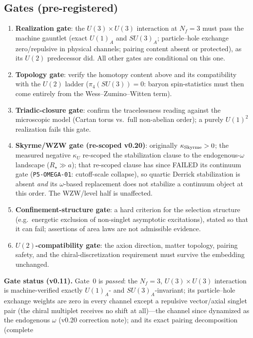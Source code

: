 \documentclass[11pt,a4paper]{article}
\begin{document}
\subsection*{Gates (pre-registered)}
\begin{enumerate}
\item[0.] \textbf{Realization gate}: the
$U(3)\times U(3)$ interaction at $N_f = 3$ must pass the machine
gauntlet (exact $U(1)_A$ and $SU(3)_A$; particle--hole exchange
zero/repulsive in physical channels; pairing content
absent or protected), as its $U(2)$ predecessor did.  All other
gates are conditional on this one.
\item[1.] \textbf{Topology gate}: verify the homotopy content
above and its compatibility with the $U(2)$ ladder
($\pi_4(SU(3)) = 0$: baryon spin-statistics must then come
entirely from the Wess--Zumino--Witten term).
\item[2.] \textbf{Triadic-closure gate}: confirm the
tracelessness reading against the microscopic model (Cartan
torus vs.\ full non-abelian order); a purely $U(1)^2$ realization
fails this gate.
\item[3.] \textbf{Skyrme/WZW gate (re-scoped v0.20)}: originally
$\kappa_{\rm Skyrme} > 0$; the measured negative $\kappa_U$
re-scoped the stabilization clause to the endogenous-$\omega$
landscape ($R_\star \gg a$); that re-scoped clause has since
FAILED its continuum gate (\texttt{P5-OMEGA-01}: cutoff-scale
collapse), so quartic Derrick stabilization is absent \emph{and}
its $\omega$-based replacement does not stabilize a continuum
object at this order.  The WZW/level half is unaffected.
\item[4.] \textbf{Confinement-structure gate}: a hard criterion
for the selection structure (e.g.\ energetic exclusion of
non-singlet asymptotic excitations), stated so that it can fail;
assertions of area laws are not admissible evidence.
\item[5.] \textbf{$U(2)$-compatibility gate}: the axion
direction, matter topology, pairing safety, and the
chiral-discretization requirement must survive the embedding
unchanged.
\end{enumerate}
\textbf{Gate status (v0.11).}  Gate~0 is \emph{passed}: the
$N_f = 3$, $U(3)\times U(3)$ interaction is machine-verified
exactly $U(1)_A$- and $SU(3)_A$-invariant; its particle--hole
exchange weights are zero in every channel except a repulsive
vector/axial singlet pair (the chiral multiplet receives no shift
at all)---the channel since dynamized as the endogenous
$\omega$ (v0.20 correction note); and its exact pairing decomposition (complete
\end{document}

